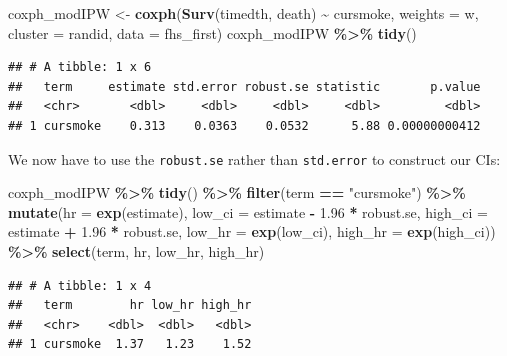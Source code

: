 \documentclass[
]{book}
\newenvironment{Shaded}{\begin{snugshade}}{\end{snugshade}}
\newcommand{\AttributeTok}[1]{\textcolor[rgb]{0.13,0.29,0.53}{#1}}
\newcommand{\FloatTok}[1]{\textcolor[rgb]{0.00,0.00,0.81}{#1}}
\newcommand{\FunctionTok}[1]{\textcolor[rgb]{0.13,0.29,0.53}{\textbf{#1}}}
\newcommand{\NormalTok}[1]{#1}
\newcommand{\OtherTok}[1]{\textcolor[rgb]{0.56,0.35,0.01}{#1}}
\newcommand{\SpecialCharTok}[1]{\textcolor[rgb]{0.81,0.36,0.00}{\textbf{#1}}}
\newcommand{\StringTok}[1]{\textcolor[rgb]{0.31,0.60,0.02}{#1}}
\begin{document}
\begin{Shaded}
\begin{Highlighting}[]
\NormalTok{coxph\_modIPW }\OtherTok{\textless{}{-}} \FunctionTok{coxph}\NormalTok{(}\FunctionTok{Surv}\NormalTok{(timedth, death) }\SpecialCharTok{\textasciitilde{}}\NormalTok{ cursmoke, }
                     \AttributeTok{weights =}\NormalTok{ w, }\AttributeTok{cluster =}\NormalTok{ randid,}
                    \AttributeTok{data =}\NormalTok{ fhs\_first)}
\NormalTok{coxph\_modIPW }\SpecialCharTok{\%\textgreater{}\%}
  \FunctionTok{tidy}\NormalTok{()}
\end{Highlighting}
\end{Shaded}

\begin{verbatim}
## # A tibble: 1 x 6
##   term     estimate std.error robust.se statistic       p.value
##   <chr>       <dbl>     <dbl>     <dbl>     <dbl>         <dbl>
## 1 cursmoke    0.313    0.0363    0.0532      5.88 0.00000000412
\end{verbatim}

We now have to use the \texttt{robust.se} rather than \texttt{std.error} to construct our CIs:

\begin{Shaded}
\begin{Highlighting}[]
\NormalTok{coxph\_modIPW }\SpecialCharTok{\%\textgreater{}\%} 
  \FunctionTok{tidy}\NormalTok{() }\SpecialCharTok{\%\textgreater{}\%} 
  \FunctionTok{filter}\NormalTok{(term }\SpecialCharTok{==} \StringTok{"cursmoke"}\NormalTok{) }\SpecialCharTok{\%\textgreater{}\%} 
  \FunctionTok{mutate}\NormalTok{(}\AttributeTok{hr =} \FunctionTok{exp}\NormalTok{(estimate),}
         \AttributeTok{low\_ci =}\NormalTok{ estimate }\SpecialCharTok{{-}} \FloatTok{1.96} \SpecialCharTok{*}\NormalTok{ robust.se, }
         \AttributeTok{high\_ci =}\NormalTok{ estimate }\SpecialCharTok{+} \FloatTok{1.96} \SpecialCharTok{*}\NormalTok{ robust.se, }
         \AttributeTok{low\_hr =} \FunctionTok{exp}\NormalTok{(low\_ci), }
         \AttributeTok{high\_hr =} \FunctionTok{exp}\NormalTok{(high\_ci)) }\SpecialCharTok{\%\textgreater{}\%} 
  \FunctionTok{select}\NormalTok{(term, hr, low\_hr, high\_hr)}
\end{Highlighting}
\end{Shaded}

\begin{verbatim}
## # A tibble: 1 x 4
##   term        hr low_hr high_hr
##   <chr>    <dbl>  <dbl>   <dbl>
## 1 cursmoke  1.37   1.23    1.52
\end{verbatim}
\end{document}
